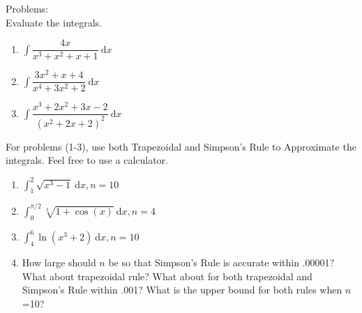 \documentclass[10pt]{article}
\newcommand{\ds}{\displaystyle}
\newcommand{\dx}{\:\mathrm{d}x}
\theoremstyle{Theorem}
\theoremstyle{definition}
\theoremstyle{remark}
\theoremstyle{custom}
\begin{document}
\noindent Problems:\\
Evaluate the integrals.
\begin{enumerate}[1.]
\item $\int \dfrac{4x}{x^3+x^2+x+1}\dx$
\item $\int \dfrac{3x^2+x+4}{x^4+3x^2+2}\dx$
\item $\int \dfrac{x^3+2x^2+3x-2}{(x^2+2x+2)^2}\dx$
\end{enumerate}
For problems (1-3), use both Trapezoidal and Simpson's Rule to Approximate the integrals. Feel free to use a calculator.
\begin{enumerate}[1.]
\item $\ds\int_1^2 \sqrt{x^3-1}\dx, n=10$
\item $\ds\int_0^{\pi/2} \sqrt[3]{1+\cos(x)}\dx, n=4$
\item $\ds\int^6_4\ln(x^3+2)\dx, n=10$

\item How large should $n$ be so that Simpson's Rule is accurate within .00001? What about trapezoidal rule? What about for both trapezoidal and Simpson's Rule within .001? What is the upper bound for both rules when $n$=10?
\end{enumerate}
\end{document}
